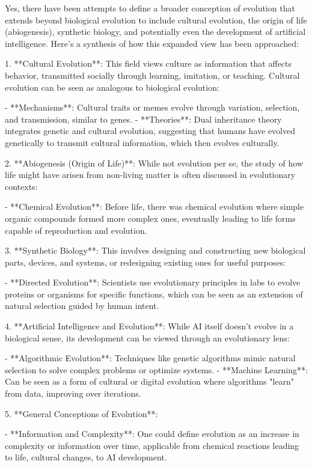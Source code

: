 \documentclass[10pt,titlepage]{book}
\begin{document}
Yes, there have been attempts to define a broader conception of evolution that extends beyond biological evolution to include cultural evolution, the origin of life (abiogenesis), synthetic biology, and potentially even the development of artificial intelligence. Here's a synthesis of how this expanded view has been approached:

1. **Cultural Evolution**: This field views culture as information that affects behavior, transmitted socially through learning, imitation, or teaching. Cultural evolution can be seen as analogous to biological evolution:

   - **Mechanisms**: Cultural traits or memes evolve through variation, selection, and transmission, similar to genes.
   - **Theories**: Dual inheritance theory integrates genetic and cultural evolution, suggesting that humans have evolved genetically to transmit cultural information, which then evolves culturally.

2. **Abiogenesis (Origin of Life)**: While not evolution per se, the study of how life might have arisen from non-living matter is often discussed in evolutionary contexts:

   - **Chemical Evolution**: Before life, there was chemical evolution where simple organic compounds formed more complex ones, eventually leading to life forms capable of reproduction and evolution.

3. **Synthetic Biology**: This involves designing and constructing new biological parts, devices, and systems, or redesigning existing ones for useful purposes:

   - **Directed Evolution**: Scientists use evolutionary principles in labs to evolve proteins or organisms for specific functions, which can be seen as an extension of natural selection guided by human intent.

4. **Artificial Intelligence and Evolution**: While AI itself doesn't evolve in a biological sense, its development can be viewed through an evolutionary lens:

   - **Algorithmic Evolution**: Techniques like genetic algorithms mimic natural selection to solve complex problems or optimize systems.
   - **Machine Learning**: Can be seen as a form of cultural or digital evolution where algorithms "learn" from data, improving over iterations.

5. **General Conceptions of Evolution**:

   - **Information and Complexity**: One could define evolution as an increase in complexity or information over time, applicable from chemical reactions leading to life, cultural changes, to AI development.
   
\end{document}
